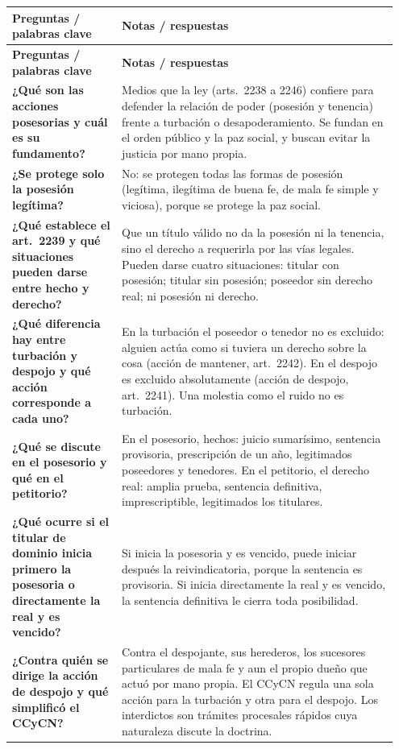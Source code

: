 \documentclass[12pt,oneside]{book}
\makeatletter
\newenvironment{cornell}{%
    \par\vspace{0.5em}
    \noindent
    \begin{longtable}{@{}>{\raggedright\arraybackslash}p{0.27\linewidth}
                         >{\raggedright\arraybackslash}p{0.68\linewidth}@{}}
    \toprule
    \textbf{Preguntas / palabras clave} & \textbf{Notas / respuestas} \\
    \midrule
    \endfirsthead
    \toprule
    \textbf{Preguntas / palabras clave} & \textbf{Notas / respuestas} \\
    \midrule
    \endhead
}{%
    \bottomrule
    \end{longtable}
}
\makeatother
\begin{document}
\begin{cornell}
\textbf{¿Qué son las acciones posesorias y cuál es su fundamento?} &
Medios que la ley (arts.~2238 a 2246) confiere para defender la relación de poder (posesión y tenencia) frente a turbación o desapoderamiento. Se fundan en el orden público y la paz social, y buscan evitar la justicia por mano propia. \\

\textbf{¿Se protege solo la posesión legítima?} &
No: se protegen todas las formas de posesión (legítima, ilegítima de buena fe, de mala fe simple y viciosa), porque se protege la paz social. \\

\textbf{¿Qué establece el art.~2239 y qué situaciones pueden darse entre hecho y derecho?} &
Que un título válido no da la posesión ni la tenencia, sino el derecho a requerirla por las vías legales. Pueden darse cuatro situaciones: titular con posesión; titular sin posesión; poseedor sin derecho real; ni posesión ni derecho. \\

\textbf{¿Qué diferencia hay entre turbación y despojo y qué acción corresponde a cada uno?} &
En la turbación el poseedor o tenedor no es excluido: alguien actúa como si tuviera un derecho sobre la cosa (acción de mantener, art.~2242). En el despojo es excluido absolutamente (acción de despojo, art.~2241). Una molestia como el ruido no es turbación. \\

\textbf{¿Qué se discute en el posesorio y qué en el petitorio?} &
En el posesorio, hechos: juicio sumarísimo, sentencia provisoria, prescripción de un año, legitimados poseedores y tenedores. En el petitorio, el derecho real: amplia prueba, sentencia definitiva, imprescriptible, legitimados los titulares. \\

\textbf{¿Qué ocurre si el titular de dominio inicia primero la posesoria o directamente la real y es vencido?} &
Si inicia la posesoria y es vencido, puede iniciar después la reivindicatoria, porque la sentencia es provisoria. Si inicia directamente la real y es vencido, la sentencia definitiva le cierra toda posibilidad. \\

\textbf{¿Contra quién se dirige la acción de despojo y qué simplificó el CCyCN?} &
Contra el despojante, sus herederos, los sucesores particulares de mala fe y aun el propio dueño que actuó por mano propia. El CCyCN regula una sola acción para la turbación y otra para el despojo. Los interdictos son trámites procesales rápidos cuya naturaleza discute la doctrina. \\


\end{cornell}
\end{document}
